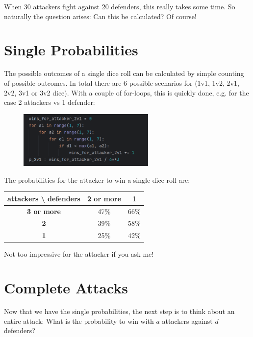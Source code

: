 \documentclass[11pt,a4paper]{article}
\begin{document}
    When 30 attackers fight against 20 defenders, this really takes some time.
    So naturally the question arises: Can this be calculated?
    Of course!


    \section{Single Probabilities}
    The possible outcomes of a single dice roll can be calculated by simple counting of possible outcomes.
    In total there are 6 possible scenarios for (1v1, 1v2, 2v1, 2v2, 3v1 or 3v2 dice).
    With a couple of for-loops, this is quickly done, e.g. for the case 2 attackers vs 1 defender:

    \begin{figure}[H]
        \centering
        \includegraphics[width=0.6\textwidth]{../images/2v1.png}
    \end{figure}

    The probabilities for the attacker to win a single dice roll are:

    \begin{table}[H]
        \centering
        \begin{tabular}{|c|c|c|}
            \hline
            \textbf{attackers \textbackslash\; defenders} & \textbf{2 or more} & \textbf{1} \\
            \hline
            \textbf{3 or more}                            & 47\%               & 66\%       \\
            \hline
            \textbf{2}                                    & 39\%               & 58\%       \\
            \hline
            \textbf{1}                                    & 25\%               & 42\%       \\
            \hline
        \end{tabular}
    \end{table}

    Not too impressive for the attacker if you ask me!


    \section{Complete Attacks}
    Now that we have the single probabilities, the next step is to think about an entire attack: What is the probability to win with $a$ attackers against $d$ defenders?
\end{document}
